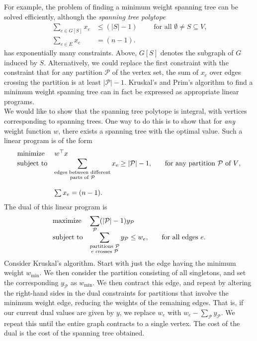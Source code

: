 	For example, the problem of finding a minimum weight spanning tree can be solved efficiently, although the \emph{spanning tree polytope}
	\begin{align*}
		\sum_{e \in G[S]} x_e &\le (|S|-1) \qquad \text{ for all $\emptyset \ne S \subseteq V$,} \\
		\sum_{e \in E} x_e &= (n-1).
	\end{align*}
	has exponentially many constraints. Above, $G[S]$ denotes the subgraph of $G$ induced by $S$. Alternatively, we could replace the first constraint with the constraint that for any partition $\mathcal{P}$ of the vertex set, the sum of $x_e$ over edges crossing the partition is at least $|\mathcal{P}|-1$. Kruskal's and Prim's algorithm to find a minimum weight spanning tree can in fact be expressed as appropriate linear programs.\\
	We would like to show that the spanning tree polytope is integral, with vertices corresponding to spanning trees. One way to do this is to show that for \emph{any} weight function $w$, there exists a spanning tree with the optimal value. Such a linear program is of the form
	\[
	\begin{array}{ll@{}ll}
	\text{minimize}  & w^\top x &\\
	\text{subject to}& \displaystyle\sum_{\substack{\text{edges between different}\\\text{parts of $\mathcal{P}$}}} x_e \ge |\mathcal{P}|-1 ,  &\qquad \text{for any partition $\mathcal{P}$ of $V$},\\\\
	                 & \sum x_{e} = (n-1). &
	\end{array}
	\]
	The dual of this linear program is
	\[
	\begin{array}{ll@{}ll}
	\text{maximize}  & \displaystyle\sum_{\mathcal{P}} (|\mathcal{P}|-1) y_\mathcal{P} &\\
	\text{subject to}& \displaystyle\sum_{\substack{\text{partitions $\mathcal{P}$} \\ e \text{ crosses }\mathcal{P}}} y_\mathcal{P} \le w_e, &\qquad \text{for all edges }e.\\
	\end{array}
	\]
	Consider Kruskal's algorithm. Start with just the edge having the minimum weight $w_{\operatorname{min}}$. We then consider the partition consisting of all singletons, and set the corresponding $y_\mathcal{P}$ as $w_{\operatorname{min}}$. We then contract this edge, and repeat by altering the right-hand sides in the dual constraints for partitions that involve the minimum weight edge, reducing the weights of the remaining edges. That is, if our current dual values are given by $y$, we replace $w_e$ with $w_e - \sum_{\mathcal{P}} y_\mathcal{P}$. We repeat this until the entire graph contracts to a single vertex. The cost of the dual is the cost of the spanning tree obtained.\\

